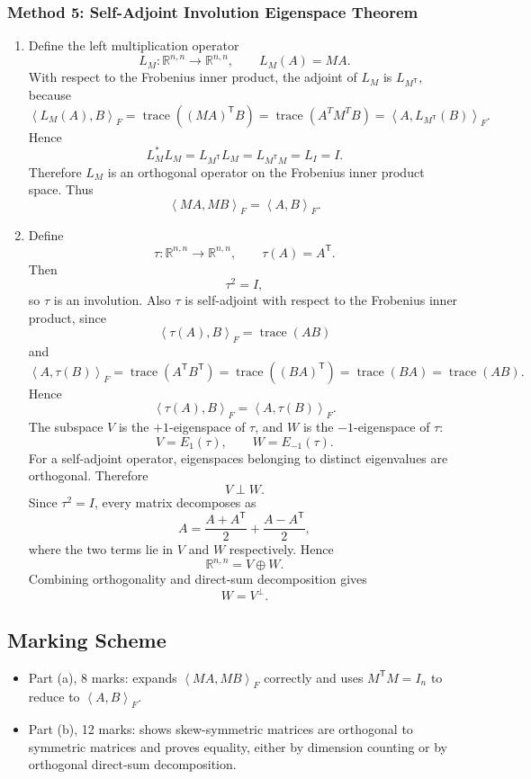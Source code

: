 \documentclass[12pt]{article}
\newcommand{\R}{\mathbb{R}}
\newcommand{\tr}{\operatorname{trace}}
\newcommand{\ipF}[2]{\left\langle #1,#2\right\rangle_F}
\newcommand{\T}{\mathsf{T}}
\begin{document}
\subsubsection{Method 5: Self-Adjoint Involution Eigenspace Theorem}
\begin{enumerate}[label=(\alph*)]
  \item Define the left multiplication operator
  \[
    L_M:\R^{n,n}\to\R^{n,n},
    \qquad
    L_M(A)=MA.
  \]
  With respect to the Frobenius inner product, the adjoint of $L_M$ is $L_{M^\T}$, because
  \[
    \ipF{L_M(A)}{B}=\tr((MA)^\T B)=\tr(A^T M^T B)=\ipF{A}{L_{M^\T}(B)}.
  \]
  Hence
  \[
    L_M^*L_M=L_{M^\T}L_M=L_{M^\T M}=L_I=I.
  \]
  Therefore $L_M$ is an orthogonal operator on the Frobenius inner product space. Thus
  \[
    \boxed{\ipF{MA}{MB}=\ipF{A}{B}.}
  \]

  \item Define
  \[
    \tau:\R^{n,n}\to\R^{n,n},
    \qquad
    \tau(A)=A^\T.
  \]
  Then
  \[
    \tau^2=I,
  \]
  so $\tau$ is an involution. Also $\tau$ is self-adjoint with respect to the Frobenius inner product, since
  \[
    \ipF{\tau(A)}{B}=\tr(A B)
  \]
  and
  \[
    \ipF{A}{\tau(B)}=\tr(A^\T B^\T)=\tr((BA)^\T)=\tr(BA)=\tr(AB).
  \]
  Hence
  \[
    \ipF{\tau(A)}{B}=\ipF{A}{\tau(B)}.
  \]
  The subspace $V$ is the $+1$-eigenspace of $\tau$, and $W$ is the $-1$-eigenspace of $\tau$:
  \[
    V=E_1(\tau),
    \qquad
    W=E_{-1}(\tau).
  \]
  For a self-adjoint operator, eigenspaces belonging to distinct eigenvalues are orthogonal. Therefore
  \[
    V\perp W.
  \]
  Since $\tau^2=I$, every matrix decomposes as
  \[
    A=\frac{A+A^\T}{2}+\frac{A-A^\T}{2},
  \]
  where the two terms lie in $V$ and $W$ respectively. Hence
  \[
    \R^{n,n}=V\oplus W.
  \]
  Combining orthogonality and direct-sum decomposition gives
  \[
    \boxed{W=V^\perp.}
  \]
\end{enumerate}

\newpage
\subsection{Marking Scheme}
\begin{itemize}[leftmargin=*]
  \item Part (a), 8 marks: expands $\ipF{MA}{MB}$ correctly and uses $M^\T M=I_n$ to reduce to $\ipF{A}{B}$.
  \item Part (b), 12 marks: shows skew-symmetric matrices are orthogonal to symmetric matrices and proves equality, either by dimension counting or by orthogonal direct-sum decomposition.
\end{itemize}
\end{document}
